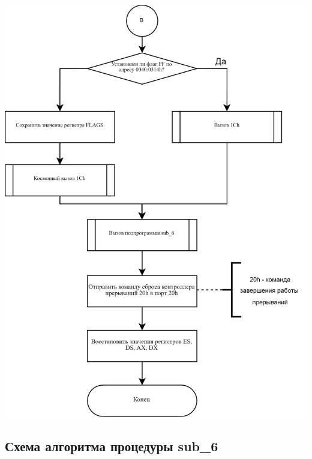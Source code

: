 \documentclass[a4paper,14pt]{article}
\begin{document}
\begin{flushright}
	\includegraphics[height=0.95\textheight]{img/int_8h-4.png}
\end{flushright}
\subsection{Схема алгоритма процедуры sub\_6}
\end{document}
